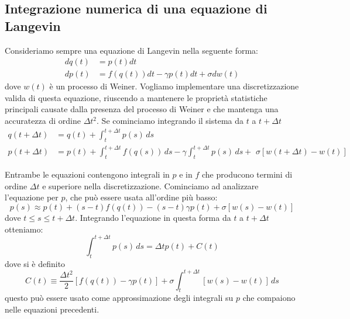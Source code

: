 \documentclass[10pt,a4paper]{article}
\begin{document}
\subsection{Integrazione numerica di una equazione di Langevin}
\label{sec:integratore}
Consideriamo sempre una equazione di Langevin nella seguente forma:
\begin{align}
	dq(t) &= p(t)dt \\
	dp(t) &= f(q(t))dt - \gamma p(t)dt + \sigma dw(t)
\end{align}
dove \(w(t)\) è un processo di Weiner. Vogliamo implementare una discretizzazione valida di questa equazione, riuscendo a mantenere le proprietà statistiche principali causate dalla presenza del processo di Weiner e che mantenga una accuratezza di ordine \(\Delta t^2\). Se cominciamo integrando il sistema da \(t\) a \(t + \Delta t\)
\begin{align}
	q(t+\Delta t) &= q(t) + \int_t^{t+\Delta t} p(s)\,ds\\
	p(t+\Delta t) &= p(t) + \int_t^{t+\Delta t} f(q(s))\,ds -\gamma \int_t^{t+\Delta t} p(s)\,ds + \,\, \sigma[w(t+\Delta t)-w(t)]
\end{align}

Entrambe le equazioni contengono integrali in \(p\) e in \(f\) che producono termini di ordine \(\Delta t\) e superiore nella discretizzazione. Cominciamo ad analizzare l'equazione per \(p\), che può essere usata all'ordine più basso:
\begin{equation}
	p(s) \approx p(t) + (s-t)f(q(t)) -(s-t)\gamma p(t) + \sigma[w(s)-w(t)]
\end{equation}
dove \(t\leq s\leq t+\Delta t\). Integrando l'equazione in questa forma da \(t\) a \(t+\Delta t\) otteniamo:
\begin{equation}
	\int_t^{t+\Delta t} p(s)\,ds = \Delta t p(t) + C(t)
\end{equation}
dove si è definito
\begin{equation}
	C(t) \equiv \frac{\Delta t^2}{2}[f(q(t))-\gamma p(t)] + \sigma \int_t^{t+\Delta t}[w(s)-w(t)]\,ds
	\label{eq:c_t}
\end{equation}
questo può essere usato come approssimazione degli integrali su \(p\) che compaiono nelle equazioni precedenti.
\end{document}
